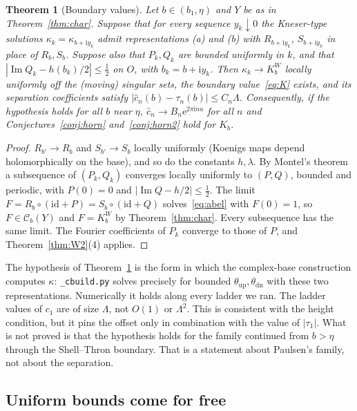 \documentclass[11pt,a4paper]{article}
\newtheorem{theorem}{Theorem}
\theoremstyle{definition}
\newcommand{\Rr}{R}
\newcommand{\Kk}{K}
\newcommand{\eee}{\mathrm{e}}
\newcommand{\ii}{\mathrm{i}}
\begin{document}
\begin{theorem}[Boundary values]\label{thm:bv}
Let $b\in(b_1,\eta)$ and $Y$ be as in Theorem~\ref{thm:char}.  Suppose that for
every sequence $y_k\downarrow0$ the Kneser-type solutions $\kappa_k=\kappa_{b+\ii y_k}$
admit representations (a) and (b) with $\Rr_{b+\ii y_k}$, $S_{b+\ii y_k}$ in
place of $\Rr_b,S_b$.  Suppose also that $P_k,Q_k$ are bounded uniformly in
$k$, and that $|\operatorname{Im}Q_k-h(b_k)/2|\le\tfrac12$ on $O$, with $b_k=b+\ii y_k$.  Then
$\kappa_k\to\Kk^W_b$ locally uniformly off the (moving) singular sets, the boundary
value~\eqref{eq:K} exists, and its separation coefficients
satisfy $|\hat c_n(b)-\tau_n(b)|\le C_n\Lambda$.  Consequently, if the
hypothesis holds for all $b$ near $\eta$,
$\hat c_n\to B_n\eee^{2\pi\ii na}$ for all $n$ and
Conjectures~\ref{conj:horn} and~\ref{conj:horn2} hold for $\Kk_b$.
\end{theorem}

\begin{proof}
$\Rr_{b'}\to\Rr_b$ and $S_{b'}\to S_b$ locally uniformly (Koenigs maps depend
holomorphically on the base), and so do the constants $h,\lambda$.  By
Montel's theorem a subsequence of $(P_k,Q_k)$ converges locally uniformly to
$(P,Q)$, bounded and periodic, with $P(0)=0$ and
$|\operatorname{Im}Q-h/2|\le\tfrac12$.  The limit
$F=\Rr_b\circ(\mathrm{id}+P)=S_b\circ(\mathrm{id}+Q)$ solves~\eqref{eq:abel}
with $F(0)=1$, so $F\in\mathcal C_b(Y)$ and $F=\Kk^W_b$ by
Theorem~\ref{thm:char}.  Every subsequence has the same limit.  The Fourier
coefficients of $P_k$ converge to those of $P$, and Theorem~\ref{thm:W2}(4)
applies.
\end{proof}

\noindent
The hypothesis of Theorem~\ref{thm:bv} is the form in which the complex-base
construction computes $\kappa$: \texttt{\_cbuild.py} solves precisely for
bounded $\theta_{\mathrm{up}},\theta_{\mathrm{dn}}$ with these two
representations.  Numerically it holds along every ladder we ran.  The ladder
values of $c_1$ are of size $\Lambda$, not $O(1)$ or $\Lambda^2$.  This is
consistent with the height condition, but it pins the offset only in
combination with the value of $|\tau_1|$.  What is not proved is that the hypothesis holds
for the family continued from $b>\eta$ through the Shell--Thron boundary.
That is a statement about Paulsen's family, not about the separation.

\subsection{Uniform bounds come for free}\label{sec:unif}
\end{document}
